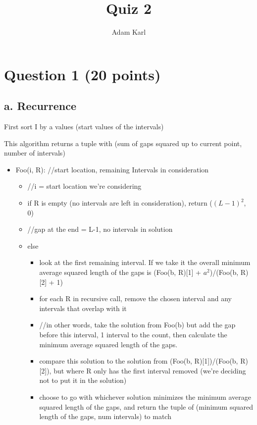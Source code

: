 \documentclass[a4paper]{article}
\title{Quiz 2}
\author{Adam Karl}
\begin{document}
\maketitle

\section{Question 1 (20 points)}
\subsection{a. Recurrence}
First sort I by a values (start values of the intervals)

This algorithm returns a tuple with (sum of gaps squared up to current point, number of intervals)

\begin{itemize}
    \item Foo(i, R): //start location, remaining Intervals in consideration
    \begin{itemize}
        \item //i = start location we're considering
        \item if R is empty (no intervals are left in consideration), return ($(L-1)^2$, 0)
        \item //gap at the end = L-1, no intervals in solution
        \item else
        \begin{itemize}
            \item look at the first remaining interval. If we take it the overall minimum average squared length of the gaps is (Foo(b, R)[1] + $a^2$)/(Foo(b, R)[2] + 1)
            \item for each R in recursive call, remove the chosen interval and any intervals that overlap with it
            \item //in other words, take the solution from Foo(b) but add the gap before this interval, 1 interval to the count, then calculate the minimum average squared length of the gaps.
            \item compare this solution to the solution from (Foo(b, R)[1])/(Foo(b, R)[2]), but where R only has the first interval removed (we're deciding not to put it in the solution)
            \item choose to go with whichever solution minimizes the minimum average squared length of the gaps, and return the tuple of (minimum squared length of the gaps, num intervals) to match
        \end{itemize}
    \end{itemize}
\end{itemize}
\end{document}
